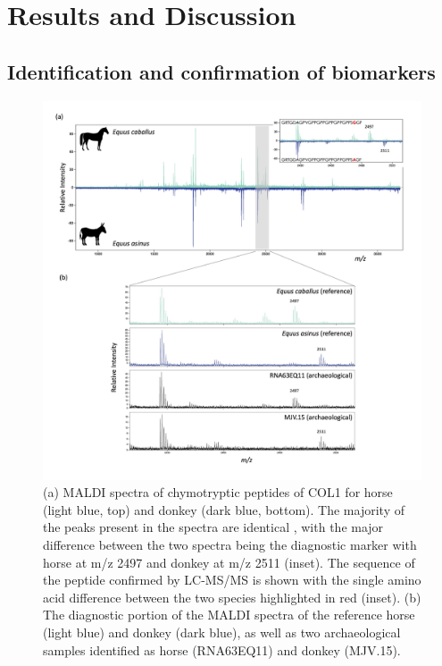 \documentclass[preprint, 3p, authoryear]{elsarticle} %
\begin{document}
\hypertarget{results-and-discussion}{%
\section{Results and Discussion}\label{results-and-discussion}}

\hypertarget{identification-and-confirmation-of-biomarkers}{%
\subsection{Identification and confirmation of biomarkers}\label{identification-and-confirmation-of-biomarkers}}



\begin{figure}
\includegraphics[width=1\linewidth]{../img/equid_marker} \caption{(a) MALDI spectra of chymotryptic peptides of COL1 for horse (light blue, top) and donkey (dark blue, bottom). The majority of the peaks present in the spectra are identical , with the major difference between the two spectra being the diagnostic marker with horse at m/z 2497 and donkey at m/z 2511 (inset). The sequence of the peptide confirmed by LC-MS/MS is shown with the single amino acid difference between the two species highlighted in red (inset). (b) The diagnostic portion of the MALDI spectra of the reference horse (light blue) and donkey (dark blue), as well as two archaeological samples identified as horse (RNA63EQ11) and donkey (MJV.15).}\label{fig:equidmarkerplot}
\end{figure}
\end{document}

